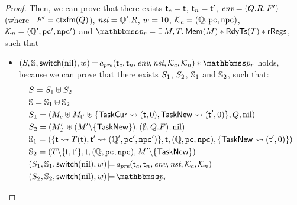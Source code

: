 \begin{proof}
    Then, we can prove that there exists 
    $\textsf{t}_c = \textsf{t}$, $\textsf{t}_n = \textsf{t}'$, 
    $\textit{env} = (Q.R, F')$ \, 
    (where \ $F' = \textsf{ctxfm}(Q)$), 
    $\textit{nst} = \mathbb{Q}'.R$, $w = 10$, 
    $\mathcal{K}_c = (\mathbb{Q}, \texttt{pc}, \texttt{npc})$, 
    $\mathcal{K}_n = (\mathbb{Q}', \texttt{pc}', \texttt{npc}')$ 
    and $\relastP_r = \exists \, \Mem, \thrdpool. \, \MemRAsrt{\Mem}
    \sepstar \RdyTsRAsrt{\thrdpool} \sepstar \rRegs$, 
    such that
    \begin{itemize}
        \item $\asrtmodel{(\state, \hpstate, \primsw(\nil), \word)}
            {\Apre(\thrdid_c, \thrdid_n, \env, \nst, \hthrdlocalst_c, 
            \hthrdlocalst_n) \sepstar \relastP_r}$ holds, because 
            we can prove that there exists $S_1$, $S_2$, 
            $\mathbb{S}_1$ and $\mathbb{S}_2$, such that: 
            \begin{align}
                & \state = \state_1 \uplus \state_2 \\
                & \hpstate = \hpstate_1 \uplus \hpstate_2 \\
                & \state_1 = (\mem_c\uplus\mem_{\tid'}\uplus
                    \{ \TaskCur \leadsto (\tid, 0), 
                       \TaskNew \leadsto (\tid', 0) \}, 
                    \Rstate, \nil) \\
                & \state_2 = (\mem_T'\uplus(\mem'\backslash\{\TaskNew\}), 
                    (\emptyset, \Rstate.\Wstack), \nil) \\
                & \hpstate_1 = (\{ \tid \leadsto \thrdpool(\tid), 
                    \tid' \leadsto (\hRstate', \pc', \npc') \}, 
                    \tid, (\hRstate, \pc, \npc), 
                    \{ \TaskNew \leadsto (\tid', 0) \}) \\
                & \hpstate_2 = (\thrdpool\backslash\{ \tid, \tid' \}, 
                    \tid, (\hRstate, \pc, \npc), \mem'\backslash\{\TaskNew\}) \\
                & \asrtmodel{(\state_1, \hpstate_1, \primsw(\nil), \word)}
                    {\Apre(\tid_c, \tid_n, \env, \nst, \hthrdlocalst_c, 
                        \hthrdlocalst_n)} \\
                & \asrtmodel{(\state_2, \hpstate_2, \primsw(\nil), \word)}
                    {\relastP_r} 
            \end{align}


\end{itemize}
\end{proof}
